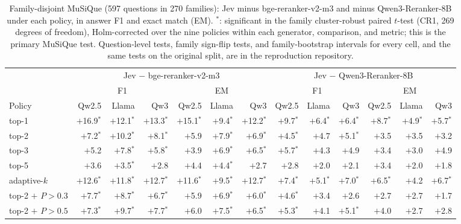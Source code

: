 \begin{table}[p]
\centering
\scriptsize
\setlength{\tabcolsep}{2.6pt}
\caption{Family-disjoint MuSiQue (597 questions in 270 families): Jev minus bge-reranker-v2-m3 and minus Qwen3-Reranker-8B under each policy, in answer F1 and exact match (EM). $^\ast$: significant in the family cluster-robust paired $t$-test (CR1, 269 degrees of freedom), Holm-corrected over the nine policies within each generator, comparison, and metric; this is the primary MuSiQue test. Question-level tests, family sign-flip tests, and family-bootstrap intervals for every cell, and the same tests on the original split, are in the reproduction repository.}
\label{tab:rag-family}
\begin{tabular}{lrrrrrrrrrrrr}
\toprule
 & \multicolumn{6}{c}{Jev $-$ bge-reranker-v2-m3} & \multicolumn{6}{c}{Jev $-$ Qwen3-Reranker-8B} \\
\cmidrule(lr){2-7}\cmidrule(lr){8-13}
 & \multicolumn{3}{c}{F1} & \multicolumn{3}{c}{EM} & \multicolumn{3}{c}{F1} & \multicolumn{3}{c}{EM} \\
\cmidrule(lr){2-4}\cmidrule(lr){5-7}\cmidrule(lr){8-10}\cmidrule(lr){11-13}
Policy & Qw2.5 & Llama & Qw3 & Qw2.5 & Llama & Qw3 & Qw2.5 & Llama & Qw3 & Qw2.5 & Llama & Qw3 \\
\midrule
top-1 & $+$16.9$^\ast$ & $+$12.1$^\ast$ & $+$13.3$^\ast$ & $+$15.1$^\ast$ & $+$9.4$^\ast$ & $+$12.2$^\ast$ & $+$9.7$^\ast$ & $+$6.4$^\ast$ & $+$6.4$^\ast$ & $+$8.7$^\ast$ & $+$4.9$^\ast$ & $+$5.7$^\ast$ \\
top-2 & $+$7.2$^\ast$ & $+$10.2$^\ast$ & $+$8.1$^\ast$ & $+$5.9 & $+$7.9$^\ast$ & $+$6.9$^\ast$ & $+$4.5$^\ast$ & $+$4.7 & $+$5.1$^\ast$ & $+$3.5 & $+$3.5 & $+$3.2 \\
top-3 & $+$5.2 & $+$7.8$^\ast$ & $+$5.8$^\ast$ & $+$3.9 & $+$6.9$^\ast$ & $+$6.5$^\ast$ & $+$5.7$^\ast$ & $+$4.3 & $+$4.9 & $+$3.4 & $+$3.0 & $+$4.9 \\
top-5 & $+$3.6 & $+$3.5$^\ast$ & $+$2.8 & $+$4.4 & $+$4.4$^\ast$ & $+$2.7 & $+$2.8 & $+$2.0 & $+$2.1 & $+$3.4 & $+$2.0 & $+$1.8 \\
adaptive-$k$ & $+$12.6$^\ast$ & $+$11.8$^\ast$ & $+$12.7$^\ast$ & $+$11.6$^\ast$ & $+$9.5$^\ast$ & $+$12.7$^\ast$ & $+$7.4$^\ast$ & $+$5.1$^\ast$ & $+$7.0$^\ast$ & $+$6.5$^\ast$ & $+$4.2 & $+$6.7$^\ast$ \\
top-2 $+$ $P>0.3$ & $+$7.7$^\ast$ & $+$8.7$^\ast$ & $+$6.7$^\ast$ & $+$5.9 & $+$6.9$^\ast$ & $+$6.0$^\ast$ & $+$4.6$^\ast$ & $+$3.4 & $+$2.6 & $+$2.7 & $+$2.7 & $+$1.7 \\
top-2 $+$ $P>0.5$ & $+$7.3$^\ast$ & $+$9.7$^\ast$ & $+$7.7$^\ast$ & $+$6.0 & $+$7.5$^\ast$ & $+$6.5$^\ast$ & $+$5.3$^\ast$ & $+$4.1 & $+$5.1$^\ast$ & $+$4.0 & $+$2.7 & $+$2.8 \\

\end{tabular}
\end{table}
